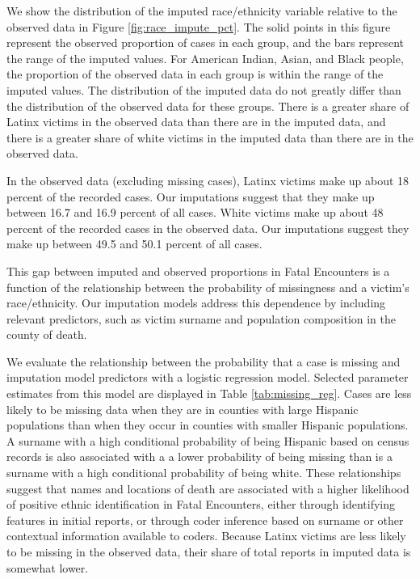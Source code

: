 \documentclass{article}
\begin{document}
We show the distribution of the imputed race/ethnicity variable relative to the observed data in Figure \ref{fig:race_impute_pct}. The solid points in this figure represent the observed proportion of cases in each group, and the bars represent the range of the imputed values. For American Indian, Asian, and Black people, the proportion of the observed data in each group is within the range of the imputed values. The distribution of the imputed data do not greatly differ than the distribution of the observed data for these groups. There is a greater share of Latinx victims in the observed data than there are in the imputed data, and there is a greater share of white victims in the imputed data than there are in the observed data. 

In the observed data (excluding missing cases), Latinx victims make up about 18 percent of the recorded cases. Our imputations suggest that they make up between 16.7 and 16.9 percent of all cases. White victims make up about 48 percent of the recorded cases in the observed data. Our imputations suggest they make up between 49.5 and 50.1 percent of all cases. 

This gap between imputed and observed proportions in Fatal Encounters is a function of the relationship between the probability of missingness and a victim's race/ethnicity. Our imputation models address this dependence by including relevant predictors, such as victim surname and population composition in the county of death. 



We evaluate the relationship between the probability that a case is missing and imputation model predictors with a logistic regression model. Selected parameter estimates from this model are displayed in Table \ref{tab:missing_reg}. Cases are less likely to be missing data when they are in counties with large Hispanic populations than when they occur in counties with smaller Hispanic populations. A surname with a high conditional probability of being Hispanic based on census records is also associated with a a lower probability of being missing than is a surname with a high conditional probability of being white. These relationships suggest that names and locations of death are associated with a higher likelihood of positive ethnic identification in Fatal Encounters, either through identifying features in initial reports, or through coder inference based on surname or other contextual information available to coders. Because Latinx victims are less likely to be missing in the observed data, their share of total reports in imputed data is somewhat lower. 
\end{document}

